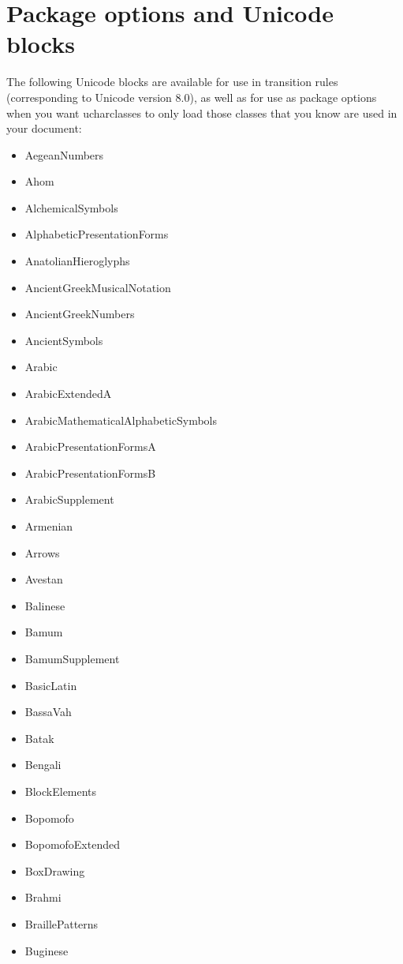 ﻿\documentclass{article}
\newenvironment{itemlist}{%
  \begin{itemize}
	\setlength{\itemsep}{0pt}
	\setlength{\parsep}{0pt}
	\setlength{\topsep}{0pt}
	\setlength{\partopsep}{0pt}
	\setlength{\parskip}{0pt}
	\setlength{\labelsep}{5pt}}%
{
  \end{itemize}}
\begin{document}
	\section{Package options and Unicode blocks}

		The following Unicode blocks are available for use in transition rules (corresponding to Unicode version 8.0), as well as for use as package options when you want ucharclasses to only load those classes that you know are used in your document:

		\begin{multicols}{2}
			\begin{itemlist}
				\item AegeanNumbers
				\item Ahom
				\item AlchemicalSymbols
				\item AlphabeticPresentationForms
				\item AnatolianHieroglyphs
				\item AncientGreekMusicalNotation
				\item AncientGreekNumbers
				\item AncientSymbols
				\item Arabic
				\item ArabicExtendedA
				\item ArabicMathematicalAlphabeticSymbols
				\item ArabicPresentationFormsA
				\item ArabicPresentationFormsB
				\item ArabicSupplement
				\item Armenian
				\item Arrows
				\item Avestan
				\item Balinese
				\item Bamum
				\item BamumSupplement
				\item BasicLatin
				\item BassaVah
				\item Batak
				\item Bengali
				\item BlockElements
				\item Bopomofo
				\item BopomofoExtended
				\item BoxDrawing
				\item Brahmi
				\item BraillePatterns
				\item Buginese

\end{itemlist}
\end{multicols}
\end{document}
